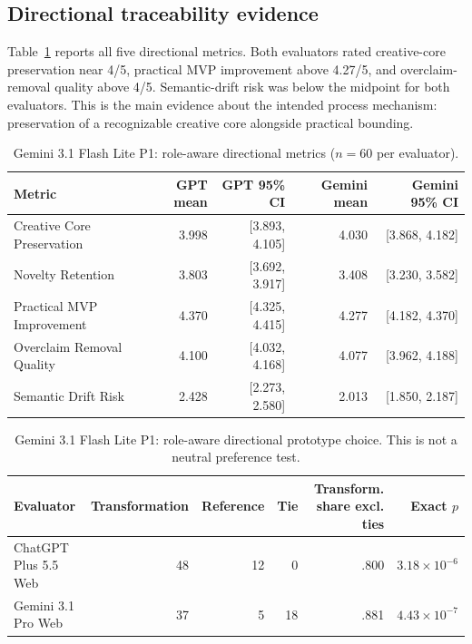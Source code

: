 \documentclass[11pt]{article}
\begin{document}
\subsection{Directional traceability evidence}
Table~\ref{tab:directionalall} reports all five directional metrics. Both evaluators
rated creative-core preservation near 4/5, practical MVP improvement above 4.27/5,
and overclaim-removal quality above 4/5. Semantic-drift risk was below the midpoint
for both evaluators. This is the main evidence about the intended process mechanism:
preservation of a recognizable creative core alongside practical bounding.

\begin{table}[htbp]\centering\small
\caption{Gemini 3.1 Flash Lite P1: role-aware directional metrics ($n=60$ per evaluator).}
\label{tab:directionalall}
\begin{tabular}{lrrrr}
\toprule
Metric & GPT mean & GPT 95\% CI & Gemini mean & Gemini 95\% CI\\
\midrule
Creative Core Preservation & 3.998 & [3.893, 4.105] & 4.030 & [3.868, 4.182] \\
Novelty Retention & 3.803 & [3.692, 3.917] & 3.408 & [3.230, 3.582] \\
Practical MVP Improvement & 4.370 & [4.325, 4.415] & 4.277 & [4.182, 4.370] \\
Overclaim Removal Quality & 4.100 & [4.032, 4.168] & 4.077 & [3.962, 4.188] \\
Semantic Drift Risk & 2.428 & [2.273, 2.580] & 2.013 & [1.850, 2.187] \\
\bottomrule
\end{tabular}
\end{table}

\begin{table}[htbp]\centering\small
\caption{Gemini 3.1 Flash Lite P1: role-aware directional prototype choice. This is not a neutral preference test.}
\label{tab:prototype}
\begin{tabular}{lrrrrr}
\toprule
Evaluator & Transformation & Reference & Tie & Transform. share excl. ties & Exact $p$\\
\midrule
ChatGPT Plus 5.5 Web & 48 & 12 & 0 & .800 & $3.18\times10^{-6}$\\
Gemini 3.1 Pro Web & 37 & 5 & 18 & .881 & $4.43\times10^{-7}$\\
\bottomrule
\end{tabular}
\end{table}
\end{document}
